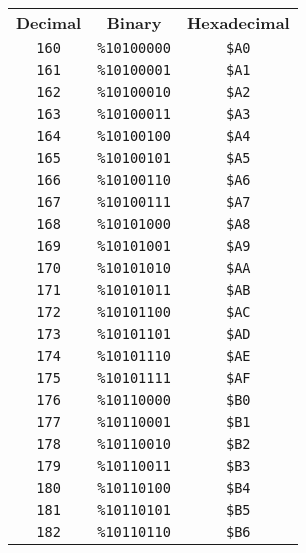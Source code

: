 \begin{multicols}{2}
\begin{center}
 \begin{tabular}{|c|c|c|}
  \hline
		\textbf{Decimal} & \textbf{Binary} & \textbf{Hexadecimal} \\ \hhline{|=|=|=|}   
 \texttt{160} & \texttt{\%10100000} &  \texttt{\$A0} \\ \hline
 \texttt{161} & \texttt{\%10100001} &  \texttt{\$A1} \\ \hline
 \texttt{162} & \texttt{\%10100010} &  \texttt{\$A2} \\ \hline
 \texttt{163} & \texttt{\%10100011} &  \texttt{\$A3} \\ \hline
 \texttt{164} & \texttt{\%10100100} &  \texttt{\$A4} \\ \hline
 \texttt{165} & \texttt{\%10100101} &  \texttt{\$A5} \\ \hline
 \texttt{166} & \texttt{\%10100110} &  \texttt{\$A6} \\ \hline
 \texttt{167} & \texttt{\%10100111} &  \texttt{\$A7} \\ \hline
 \texttt{168} & \texttt{\%10101000} &  \texttt{\$A8} \\ \hline
 \texttt{169} & \texttt{\%10101001} &  \texttt{\$A9} \\ \hline
 \texttt{170} & \texttt{\%10101010} &  \texttt{\$AA} \\ \hline
 \texttt{171} & \texttt{\%10101011} &  \texttt{\$AB} \\ \hline
 \texttt{172} & \texttt{\%10101100} &  \texttt{\$AC} \\ \hline
 \texttt{173} & \texttt{\%10101101} &  \texttt{\$AD} \\ \hline
 \texttt{174} & \texttt{\%10101110} &  \texttt{\$AE} \\ \hline
 \texttt{175} & \texttt{\%10101111} &  \texttt{\$AF} \\ \hline
 \texttt{176} & \texttt{\%10110000} &  \texttt{\$B0} \\ \hline
 \texttt{177} & \texttt{\%10110001} &  \texttt{\$B1} \\ \hline
 \texttt{178} & \texttt{\%10110010} &  \texttt{\$B2} \\ \hline
 \texttt{179} & \texttt{\%10110011} &  \texttt{\$B3} \\ \hline
 \texttt{180} & \texttt{\%10110100} &  \texttt{\$B4} \\ \hline
 \texttt{181} & \texttt{\%10110101} &  \texttt{\$B5} \\ \hline
 \texttt{182} & \texttt{\%10110110} &  \texttt{\$B6} \\ \hline

\end{tabular}
\end{center}
\end{multicols}
